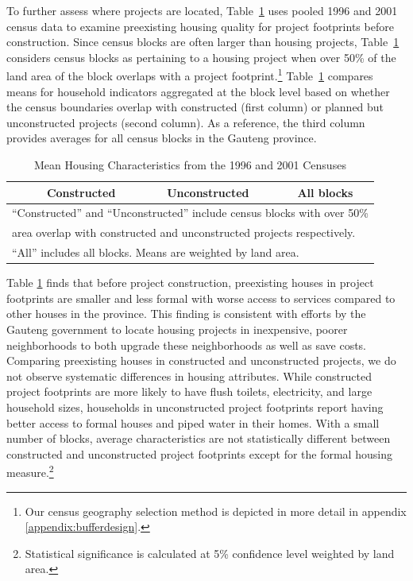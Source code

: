 \documentclass[12pt]{article}
\begin{document}

To further assess where projects are located, Table~\ref{table:projectdescriptivescensus} uses pooled 1996 and 2001 census data to examine preexisting housing quality for project footprints before construction.  Since census blocks are often larger than housing projects, Table~\ref{table:projectdescriptivescensus} considers census blocks as pertaining to a housing project when over 50\% of the land area of the block overlaps with a project footprint.\footnote{Our census geography selection method is depicted in more detail in appendix \ref{appendix:bufferdesign}.}  Table~\ref{table:projectdescriptivescensus} compares means for household indicators aggregated at the block level based on whether the census boundaries overlap with constructed (first column) or planned but unconstructed projects (second column).  As a reference, the third column provides averages for all census blocks in the Gauteng province.

\begin{table}[h!]
	\centering
	\caption{Mean Housing Characteristics from the 1996 and 2001 Censuses}\label{table:projectdescriptivescensus}
\vspace{-2mm}
\begin{tabular}{l*{1}{ccc}}
\toprule
& Constructed & Unconstructed & All blocks \\
\midrule
 
\bottomrule
\multicolumn{4}{l}{\scriptsize ``Constructed'' and ``Unconstructed'' include census blocks with over 50\% } \\ [-.5em]
\multicolumn{4}{l}{\scriptsize  area overlap with constructed and unconstructed projects respectively. } \\ [-.5em]
\multicolumn{4}{l}{\scriptsize ``All''  includes all blocks.  Means are weighted by land area.}
\end{tabular}
\end{table}


Table \ref{table:projectdescriptivescensus} finds that before project construction, preexisting houses in project footprints are smaller and less formal with worse access to services compared to other houses in the province.  This finding is consistent with efforts by the Gauteng government to locate housing projects in inexpensive, poorer neighborhoods to both upgrade these neighborhoods as well as save costs.  Comparing preexisting houses in constructed and unconstructed projects, we do not observe systematic differences in housing attributes.  While constructed project footprints are more likely to have flush toilets, electricity, and large household sizes, households in unconstructed project footprints report having better access to formal houses and piped water in their homes.  With a small number of blocks, average characteristics are not statistically different between constructed and unconstructed project footprints except for the formal housing measure.\footnote{Statistical significance is calculated at 5\% confidence level weighted by land area.}
\end{document}
